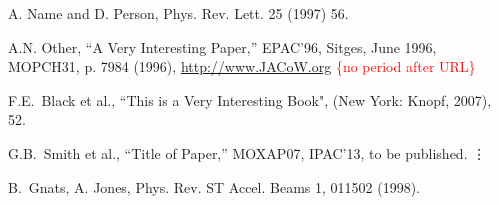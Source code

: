 \documentclass[a4paper]{jacow}
\begin{document}


\newpage
\raggedend 

\begin{thebibliography}{99}   %


	A. Name and D. Person,
	Phys. Rev. Lett. 25 (1997) 56.

	A.N. Other,
	``A Very Interesting Paper,''
	EPAC'96, Sitges, June 1996, MOPCH31, p. 7984 (1996),
	\url{http://www.JACoW.org}  \hfill\textcolor{red}{\{no period after URL\}}

	F.E.~Black et al.,
	``This is a Very Interesting Book",
	(New York: Knopf, 2007), 52.

	G.B.~Smith et al.,
	``Title of Paper,'' MOXAP07, IPAC'13,
	to be published.\newline
	\hspace*{-1.1em}\mbox{\vdots}

\addtocounter{enumi}{5}
	B.~Gnats, A. Jones,
	Phys. Rev. ST Accel. Beams 1, 011502 (1998).

\end{thebibliography}
\end{document}
